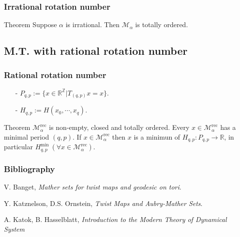 \documentclass[12 pt]{beamer}
\begin{document}
\begin{frame}
	\frametitle{Irrational rotation number}
	
	\begin{block}{Theorem}
		Suppose $\alpha$ is irrational. Then $\mathcal{M}_{\alpha}$ is totally ordered.
	\end{block}
\end{frame}

\subsection{M.T. with rational rotation number}

\begin{frame}
	\frametitle{Rational rotation number}
	
	\begin{itemize}
		\item[-] $P_{q, p} := \{ x \in \mathbb{R}^{\mathbb{Z}} | T_{(q, p)} x = x \}$.
		\item[-] $H_{q, p} := H(x_0, \cdots, x_q)$.
	\end{itemize}
	
	\begin{block}{Theorem}
		$\mathcal{M}_{\alpha}^{\text{rec}}$ is non-empty, closed and totally ordered. Every $x \in \mathcal{M}_{\alpha}^{\text{rec}}$ has a minimal period $(q, p)$. If $x \in \mathcal{M}_{\alpha}^{\text{rec}}$ then $x$ is a minimun of $H_{q, p}: P_{q, p} \rightarrow \mathbb{R}$, in particular $H_{q, p}^{\text{min}} \ (\forall x \in \mathcal{M}_{\alpha}^{\text{rec}} )$.
	\end{block}
\end{frame}


\begin{frame}{}
    \frametitle{Bibliography}
    
    
    \begin{thebibliography}{ABC9999}

    \bibitem[R1]{}
    V. Banget,
    \textit{Mather sets for twist maps and geodesic on tori}.
	    
	\bibitem[R2]{}
    Y. Katznelson, D.S. Ornstein, 
    \textit{Twist Maps and Aubry-Mather Sets}.
    
    \bibitem[R3]{}
    A. Katok, B. Hasselblatt,
    \textit{Introduction to the Modern Theory of Dynamical System}
    
    \end{thebibliography}
        
\end{frame}
\end{document}
